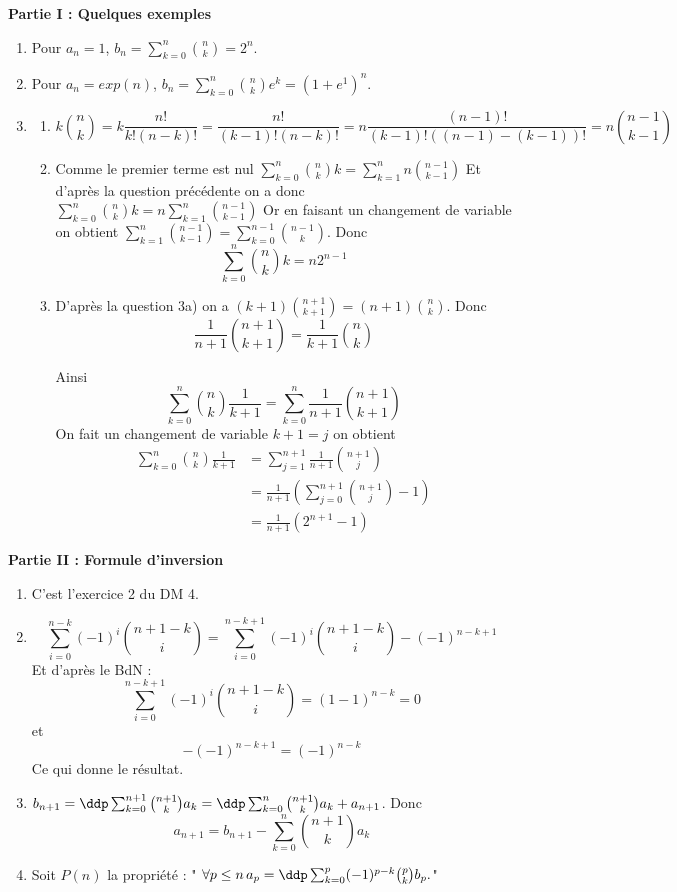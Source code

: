 \begin{correction}
\begin{center}
\textbf{Partie I : Quelques exemples}
\end{center}
\begin{enumerate}
\item Pour $a_n=1$, $b_n=\sum_{k=0}^n \binom{n}{k}  =2^n$.
\item  Pour $a_n=exp(n)$, $b_n=\sum_{k=0}^n \binom{n}{k}e^k  =(1+e^1)^n$.
\item
\begin{enumerate}
\item  $$k\binom{n}{k}= k \frac{n! }{k! (n-k)!} = \frac{n! }{(k-1)! (n-k)!}  = n \frac{(n-1)! }{(k-1)! ((n-1)-(k-1))!}=  n\binom{n-1}{k-1}$$
\item
Comme le premier terme est nul  $\sum_{k=0}^n \binom{n}{k} k = \sum_{k=1}^n n\binom{n-1}{k-1}$
Et d'après la question précédente on a donc $ \sum_{k=0}^n \binom{n}{k} k= n  \sum_{k=1}^n \binom{n-1}{k-1}$
Or en faisant un changement de variable on obtient $\sum_{k=1}^n \binom{n-1}{k-1}= \sum_{k=0}^{n-1} \binom{n-1}{k}$. 
Donc $$ \sum_{k=0}^n \binom{n}{k} k = n 2^{n-1}$$

\item 
D'après la question 3a) on a $ (k+1)\binom{n+1}{k+1} = (n+1)\binom{n}{k}$. Donc 
$$\frac{1}{n+1}\binom{n+1}{k+1} =\frac{1}{k+1}\binom{n}{k}$$

Ainsi $$\sum_{k=0}^n \binom{n}{k} \frac{1}{k+1} = \sum_{k=0}^{n} \frac{1}{n+1}\binom{n+1}{k+1}$$
On fait un changement de variable $k+1=j$ on obtient 
\begin{align*}
\sum_{k=0}^n \binom{n}{k} \frac{1}{k+1} &=  \sum_{j=1}^{n+1} \frac{1}{n+1}\binom{n+1}{j}\\
															&=  \frac{1}{n+1} \left( \sum_{j=0}^{n+1} \binom{n+1}{j} -1\right)\\
															&= \frac{1}{n+1} \left( 2^{n+1}-1\right)
\end{align*}
\end{enumerate}
\end{enumerate}



\begin{center}
\textbf{Partie II : Formule d'inversion }
\end{center}
\begin{enumerate}
\item C'est l'exercice 2 du DM 4.
\item 
$$\sum_{i=0}^{n-k} (-1)^i  \binom{n+1-k}{i}= \sum_{i=0}^{n-k+1} (-1)^i  \binom{n+1-k}{i} -(-1)^{n-k+1} $$ 
Et d'après le BdN : 
$$ \sum_{i=0}^{n-k+1} (-1)^i  \binom{n+1-k}{i} =(1-1)^{n-k} =0$$ 
et 
$$-(-1)^{n-k+1} =(-1)^{n-k}$$
Ce qui donne le résultat. 
\item $b_{n+1} = \ddp \sum_{k=0}^{n+1} \binom{n+1}{k} a_k =\ddp  \sum_{k=0}^{n} \binom{n+1}{k} a_k   +a_{n+1}$. Donc
$$a_{n+1} = b_{n+1}-\sum_{k=0}^{n} \binom{n+1}{k} a_k$$
\item Soit $P(n)$ la propriété : " $\forall p \leq n \, a_p =\ddp \sum_{k=0}^p (-1)^{p-k} \binom{p}{k} b_p.$"\\


\end{enumerate}
\end{correction}
